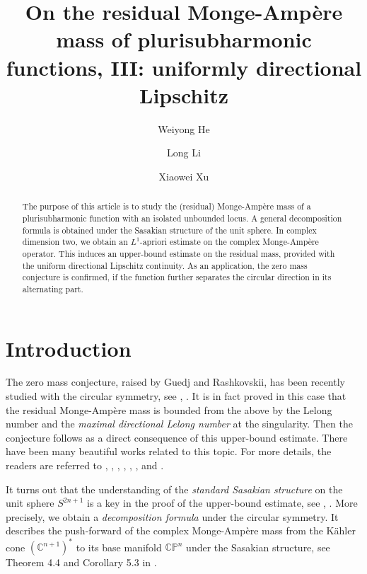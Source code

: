 \documentclass[a4paper,11pt]{amsart}
\title[Zero mass conjecture]
{On the residual Monge-Amp\`{e}re mass of plurisubharmonic functions, III: 
uniformly directional Lipschitz}
\author{Weiyong He}
\author{Long Li}
\author{Xiaowei Xu}
\numberwithin{equation}{section}
\def\bC{{\mathbb C}}
\def\bP{{\mathbb P}}
\begin{document}
\maketitle 

\begin{abstract}
The purpose of this article is to study the (residual) Monge-Amp\`{e}re mass 
of a plurisubharmonic function with an isolated unbounded locus. 
A general decomposition formula is obtained
under the Sasakian structure of the unit sphere.  
In complex dimension two, 
we obtain an $L^1$-apriori estimate on the complex Monge-Amp\`ere operator. 
This induces an upper-bound estimate on the residual mass, provided with the uniform 
directional Lipschitz continuity. 
As an application, 
 the zero mass conjecture is confirmed, 
 if the function further separates the circular direction in its alternating part. 
\end{abstract}






\smallskip



\section{Introduction}
\smallskip 

The zero mass conjecture,
raised by Guedj and Rashkovskii, 
has been recently studied with the circular symmetry, see \cite{Li23}, \cite{HLX}.
It is in fact proved in this case that 
the residual Monge-Amp\`ere mass
is bounded from the above by the Lelong number and the \emph{maximal directional Lelong number}
at the singularity.
Then the conjecture follows as a direct consequence of this upper-bound estimate. 
There have been many beautiful works related to this topic. 
For more details, the readers are referred to 
 \cite{G10}, \cite{Ra01}, \cite{Ra06}, \cite{Ra13}, \cite{Wik05}, \cite{BFJ07}, \cite{Ra16} and \cite{DGZ15}.

It turns out that  
the understanding of the \emph{standard Sasakian structure} 
on the unit sphere $S^{2n+1}$ is a key in the proof of the upper-bound estimate, 
see \cite{BG08}, \cite{SH62}.
More precisely, 
we obtain a \emph{decomposition formula} under the circular symmetry. 
It describes the push-forward  
of the complex Monge-Amp\`ere mass from the K\"ahler cone $(\bC^{n+1})^*$
to its base manifold $\bC\bP^n$ under the Sasakian structure, see Theorem 4.4 and Corollary 5.3 in \cite{HLX}.
\end{document}
